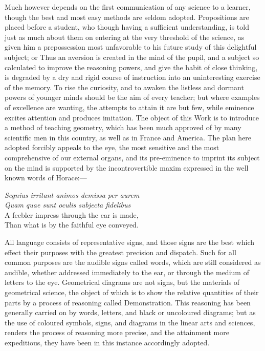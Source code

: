 \documentclass{byrne-book}
\begin{document}
Much however depends on the first communication of any science to a learner, though the best and most easy methods are seldom adopted. Propositions are placed before a student, who though having a sufficient understanding, is told just as much about them on entering at the very threshold of the science, as given him a prepossession most unfavorable to his future study of this delightful subject; or  %
Thus an aversion is created in the mind of the pupil, and a subject so calculated to improve the reasoning powers, and give the habit of close thinking, is degraded by a dry and rigid course of instruction into an uninteresting exercise of the memory. To rise the curiosity, and to awaken the listless and dormant powers of younger minds should be the aim of every teacher; but where examples of excellence are wanting, the attempts to attain it are but few, while eminence excites attention and produces imitation. The object of this Work is to introduce a method of teaching geometry, which has been much approved of by many scientific men in this country, as well as in France and America. The plan here adopted forcibly appeals to the eye, the most sensitive and the most comprehensive of our external organs, and its pre-eminence to imprint its subject on the mind is supported by the incontrovertible maxim expressed in the well known words of Horace:—

\begin{center}
\emph{Segnius irritant animos demissa per aurem\\
Quam quae sunt oculis subjecta fidelibus}\\
\baselineskip
A feebler impress through the ear is made,\\
Than what is by the faithful eye conveyed.
\end{center}

All language consists of representative signs, and those signs are the best which effect their purposes with the greatest precision and dispatch. Such for all common purposes are the audible signs called words, which are still considered as audible, whether addressed immediately to the ear, or through the medium of letters to the eye. Geometrical diagrams are not signs, but the materials of geometrical science, the object of which is to show the relative quantities of their parts by a process of reasoning called Demonstration. This reasoning has been generally carried on by words, letters, and black or uncoloured diagrams; but as the use of coloured symbols, signs, and diagrams in the linear arts and sciences, renders the process of reasoning more precise, and the attainment more expeditious, they have been in this instance accordingly adopted.
\end{document}
